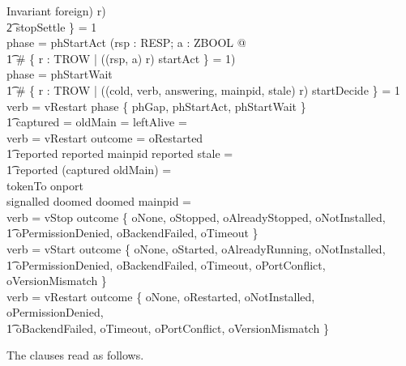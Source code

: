 \documentclass[a4paper,10pt,fleqn]{article}
\begin{document}
\begin{schema}{Invariant}
    foreign) \mapsto r) \\
  \t2 \in stopSettle \} = 1 \\
  phase = phStartAct \implies (\forall rsp : RESP; a : ZBOOL @ \\
  \t1 \# \{ r : TROW | ((rsp, a) \mapsto r) \in startAct \} = 1) \\
  phase = phStartWait \implies \\
  \t1 \# \{ r : TROW | ((cold, verb, answering, mainpid, stale) \mapsto r)
    \in startDecide \} = 1 \\
  verb = vRestart \land phase \in \{ phGap, phStartAct, phStartWait \}
    \implies \\
  \t1 captured = \emptyset \land oldMain = \emptyset \land
    leftAlive = \emptyset \\
  verb = vRestart \land outcome = oRestarted \implies \\
  \t1 reported \neq \emptyset \land reported \subseteq mainpid \land
    reported \cap stale = \emptyset \land \\
  \t1 reported \cap (captured \cup oldMain) = \emptyset \\
  tokenTo \subseteq onport \\
  signalled \subseteq doomed \land doomed \cap mainpid = \emptyset \\
  verb = vStop \implies outcome \in \{ oNone, oStopped, oAlreadyStopped,
    oNotInstalled, \\
  \t1 oPermissionDenied, oBackendFailed, oTimeout \} \\
  verb = vStart \implies outcome \in \{ oNone, oStarted, oAlreadyRunning,
    oNotInstalled, \\
  \t1 oPermissionDenied, oBackendFailed, oTimeout, oPortConflict,
    oVersionMismatch \} \\
  verb = vRestart \implies outcome \in \{ oNone, oRestarted, oNotInstalled,
    oPermissionDenied, \\
  \t1 oBackendFailed, oTimeout, oPortConflict, oVersionMismatch \}
\end{schema}

The clauses read as follows.
\end{document}
